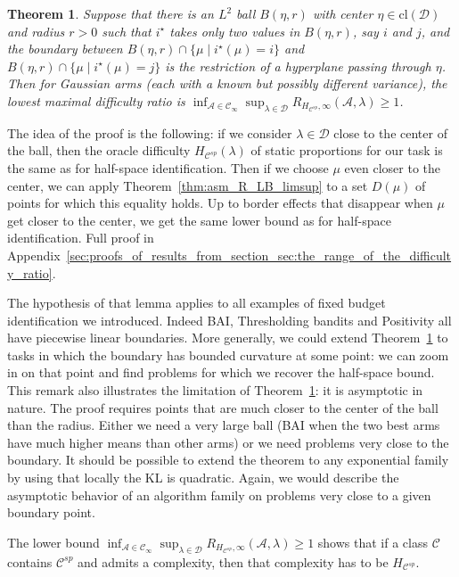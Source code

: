 \documentclass{article}
\newtheorem{theorem}{Theorem}
\begin{document}
\begin{theorem}\label{thm:flat_boundary}
Suppose that there is an $L^2$ ball $B(\eta, r)$ with center $\eta \in \mathrm{cl}(\mathcal D)$ and radius $r > 0$ such that $i^\star$ takes only two values in $B(\eta, r)$, say $i$ and $j$, and the boundary between $B(\eta, r) \cap \{\mu \mid i^\star(\mu) = i\}$ and $B(\eta, r) \cap \{\mu \mid i^\star(\mu) = j\}$ is the restriction of a hyperplane passing through $\eta$. Then for Gaussian arms (each with a known but possibly different variance), the lowest maximal difficulty ratio is $\inf_{\mathcal A \in \mathcal C_\infty} \sup_{\lambda \in \mathcal D} R_{H_{\mathcal C^{sp}}, \infty}(\mathcal A, \lambda) \ge 1$.
\end{theorem}

The idea of the proof is the following: if we consider $\lambda \in \mathcal D$ close to the center of the ball, then the oracle difficulty $H_{\mathcal C^{sp}}(\lambda)$ of static proportions for our task is the same as for half-space identification.
Then if we choose $\mu$ even closer to the center, we can apply Theorem~\ref{thm:asm_R_LB_limsup} to a set $D(\mu)$ of points for which this equality holds.
Up to border effects that disappear when $\mu$ get closer to the center, we get the same lower bound as for half-space identification.
Full proof in Appendix~\ref{sec:proofs_of_results_from_section_sec:the_range_of_the_difficulty_ratio}.

The hypothesis of that lemma applies to all examples of fixed budget identification we introduced. Indeed BAI, Thresholding bandits and Positivity all have piecewise linear boundaries.
More generally, we could extend Theorem~\ref{thm:flat_boundary} to tasks in which the boundary has bounded curvature at some point: we can zoom in on that point and find problems for which we recover the half-space bound. This remark also illustrates the limitation of Theorem~\ref{thm:flat_boundary}: it is asymptotic in nature.
The proof requires points that are much closer to the center of the ball than the radius.
Either we need a very large ball (BAI when the two best arms have much higher means than other arms) or we need problems very close to the boundary.
It should be possible to extend the theorem to any exponential family by using that locally the KL is quadratic. Again, we would describe the asymptotic behavior of an algorithm family on problems very close to a given boundary point.

The lower bound $\inf_{\mathcal A \in \mathcal C_\infty} \sup_{\lambda \in \mathcal D} R_{H_{\mathcal C^{sp}}, \infty}(\mathcal A, \lambda) \ge 1$ shows that if a class $\mathcal C$ contains $\mathcal C^{sp}$ and admits a complexity, then that complexity has to be $H_{\mathcal C^{sp}}$.
\end{document}
